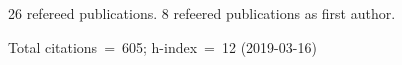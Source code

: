 26 refereed publications. 8 refeered publications as first author.

Total citations~=~605; h-index~=~12 (2019-03-16)